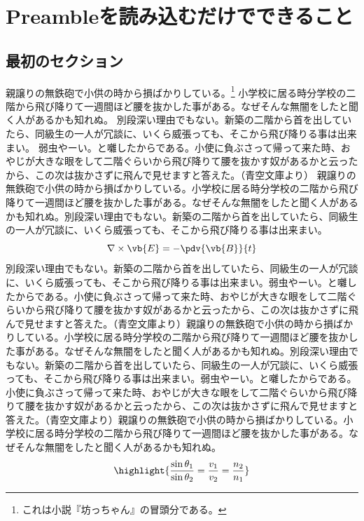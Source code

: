 \chapter{Preambleを読み込むだけでできること}
\section{最初のセクション}
親譲りの無鉄砲で小供の時から損ばかりしている。\footnote{これは小説『坊っちゃん』の冒頭分である。}
小学校に居る時分学校の二階から飛び降りて一週間ほど腰を抜かした事がある。なぜそんな無闇をしたと聞く人があるかも知れぬ。
別段深い理由でもない。新築の二階から首を出していたら、同級生の一人が冗談に、いくら威張っても、そこから飛び降りる事は出来まい。
弱虫やーい。と囃したからである。小使に負ぶさって帰って来た時、おやじが大きな眼をして二階ぐらいから飛び降りて腰を抜かす奴があるかと云ったから、この次は抜かさずに飛んで見せますと答えた。（青空文庫より）
親譲りの無鉄砲で小供の時から損ばかりしている。小学校に居る時分学校の二階から飛び降りて一週間ほど腰を抜かした事がある。なぜそんな無闇をしたと聞く人があるかも知れぬ。別段深い理由でもない。新築の二階から首を出していたら、同級生の一人が冗談に、いくら威張っても、そこから飛び降りる事は出来まい。
\begin{equation}
    \label{eq:faraday}
    \nabla \times \vb{E} = -\pdv{\vb{B}}{t}
\end{equation}
別段深い理由でもない。新築の二階から首を出していたら、同級生の一人が冗談に、いくら威張っても、そこから飛び降りる事は出来まい。弱虫やーい。と囃したからである。小使に負ぶさって帰って来た時、おやじが大きな眼をして二階ぐらいから飛び降りて腰を抜かす奴があるかと云ったから、この次は抜かさずに飛んで見せますと答えた。（青空文庫より）親譲りの無鉄砲で小供の時から損ばかりしている。小学校に居る時分学校の二階から飛び降りて一週間ほど腰を抜かした事がある。なぜそんな無闇をしたと聞く人があるかも知れぬ。別段深い理由でもない。新築の二階から首を出していたら、同級生の一人が冗談に、いくら威張っても、そこから飛び降りる事は出来まい。弱虫やーい。と囃したからである。小使に負ぶさって帰って来た時、おやじが大きな眼をして二階ぐらいから飛び降りて腰を抜かす奴があるかと云ったから、この次は抜かさずに飛んで見せますと答えた。（青空文庫より）親譲りの無鉄砲で小供の時から損ばかりしている。小学校に居る時分学校の二階から飛び降りて一週間ほど腰を抜かした事がある。なぜそんな無闇をしたと聞く人があるかも知れぬ。
\begin{equation}
    \label{eq:refraction}
    \highlight{\frac{\sin \theta_1}{\sin \theta_2} = \frac{v_1}{v_2} = \frac{n_2}{n_1}}
\end{equation}
